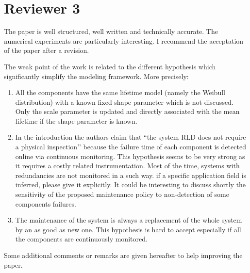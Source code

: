 \documentclass[authoryear]{elsarticle}
\begin{document}
\section*{Reviewer 3}

The paper is well structured, well written and technically accurate. The numerical experiments are particularly interesting. I recommend the acceptation of the paper after a revision. 

The weak point of the work is related to the different hypothesis which significantly simplify the modeling framework. More precisely:

\begin{enumerate}
\item All the components have the same lifetime model (namely the Weibull distribution) with a known fixed shape parameter which is not discussed. Only the scale parameter is updated and directly associated with the mean lifetime if the shape parameter is known.

\item In the introduction the authors claim that ``the system RLD does not require a physical inspection’’ because the failure time of each component is detected online via continuous monitoring. This hypothesis seems to be very strong as it requires a costly related instrumentation. Most of the time, systems with redundancies are not monitored in a such way. if a specific application field is inferred, please give it explicitly. It could be interesting to discuss shortly the sensitivity of the proposed maintenance policy to non-detection of some components failures. 

\item The maintenance of the system is always a replacement of the whole system by an as good as new one. This hypothesis is hard to accept especially if all the components are continuously monitored. 

\end{enumerate}

Some additional comments or remarks are given hereafter to help improving the paper. 
\end{document}
